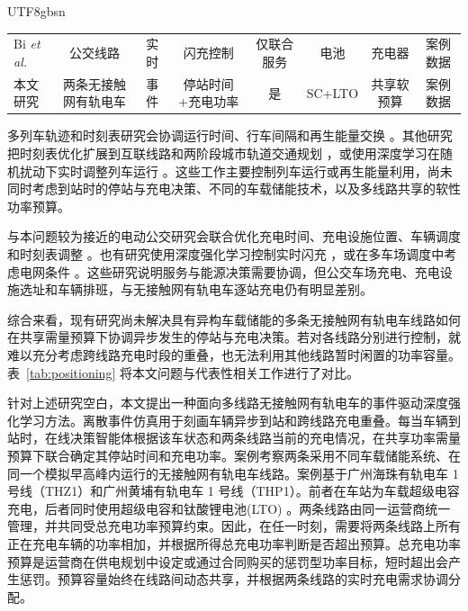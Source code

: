 \documentclass[conference]{IEEEtran}
\newcommand{\thz}{THZ1}
\newcommand{\thp}{THP1}
\begin{document}
\begin{CJK*}{UTF8}{gbsn}
\begin{table}[t]
\begin{tabular}{p{2.5cm}ccccccc}
Bi \textit{et al.} \cite{bi2024realtime}
& 公交线路
& 实时
& 闪充控制
& 仅联合服务
& 电池
& 充电器
& 案例数据 \\

本文研究
& 两条无接触网有轨电车
& 事件
& 停站时间+充电功率
& 是
& SC+LTO
& 共享软预算
& 案例数据 \\
\bottomrule
\end{tabular}
\end{table}

多列车轨迹和时刻表研究会协调运行时间、行车间隔和再生能量交换 \cite{wang2019multitrain,liu2020robust,yang2020biobjective}。其他研究把时刻表优化扩展到互联线路和两阶段城市轨道交通规划 \cite{huang2021integrated,huang2023twostage}，或使用深度学习在随机扰动下实时调整列车运行 \cite{liao2020realtime}。这些工作主要控制列车运行或再生能量利用，尚未同时考虑到站时的停站与充电决策、不同的车载储能技术，以及多线路共享的软性功率预算。

与本问题较为接近的电动公交研究会联合优化充电时间、充电设施位置、车辆调度和时刻表调整 \cite{he2020charging,hu2022joint,li2023cooperative,duan2023integrated}。也有研究使用深度强化学习控制实时闪充 \cite{bi2024realtime}，或在多车场调度中考虑电网条件 \cite{wu2022multidepot}。这些研究说明服务与能源决策需要协调，但公交车场充电、充电设施选址和车辆排班，与无接触网有轨电车逐站充电仍有明显差别。

综合来看，现有研究尚未解决具有异构车载储能的多条无接触网有轨电车线路如何在共享需量预算下协调异步发生的停站与充电决策。若对各线路分别进行控制，就难以充分考虑跨线路充电时段的重叠，也无法利用其他线路暂时闲置的功率容量。表~\ref{tab:positioning} 将本文问题与代表性相关工作进行了对比。

针对上述研究空白，本文提出一种面向多线路无接触网有轨电车的事件驱动深度强化学习方法。离散事件仿真用于刻画车辆异步到站和跨线路充电重叠。每当车辆到站时，在线决策智能体根据该车状态和两条线路当前的充电情况，在共享功率需量预算下联合确定其停站时间和充电功率。案例考察两条采用不同车载储能系统、在同一个模拟早高峰内运行的无接触网有轨电车线路。案例基于广州海珠有轨电车 1 号线（\thz）和广州黄埔有轨电车 1 号线（\thp）。前者在车站为车载超级电容充电，后者同时使用超级电容和钛酸锂电池(LTO) \cite{haizhu_wiki,haizhu_baike,huangpu_wiki,huangpu_sasac}。两条线路由同一运营商统一管理，并共同受总充电功率预算约束。因此，在任一时刻，需要将两条线路上所有正在充电车辆的功率相加，并根据所得总充电功率判断是否超出预算。总充电功率预算是运营商在供电规划中设定或通过合同购买的惩罚型功率目标，短时超出会产生惩罚。预算容量始终在线路间动态共享，并根据两条线路的实时充电需求协调分配。



\end{CJK*}
\end{document}
